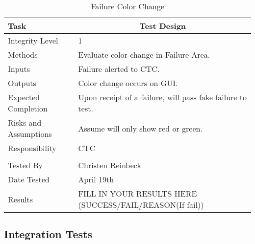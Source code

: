 \documentclass[]{article}
\begin{document}
\begin{table}[H]
	\centering
	\caption{Failure Color Change}
	\begin{tabular}{|l|l|}
		\hline
		Task & \multicolumn{1}{c|}{Test Design} \\ \hline
		Integrity Level & 1 \\ \hline
		Methods & Evaluate color change in Failure Area.\\ \hline
		Inputs &  Failure alerted to CTC. \\ \hline
		Outputs &  Color change occurs on GUI. \\ \hline
		Expected Completion & \parbox[t]{10cm}{Upon receipt of a failure, will pass fake failure to test.}\\ \hline
		Risks and Assumptions & \parbox[t]{10cm}{Assume will only show red or green.} \\ \hline
		Responsibility & CTC\\ \hline
		\\ \hline
		Tested By   &  Christen Reinbeck\\	\hline
		Date Tested & \parbox[t]{10cm}{April 19th}\\ \hline
		Results & FILL IN YOUR RESULTS HERE (SUCCESS/FAIL/REASON(If fail))\\ \hline
	\end{tabular}
\end{table}
\subsection{Integration Tests}
\end{document}
